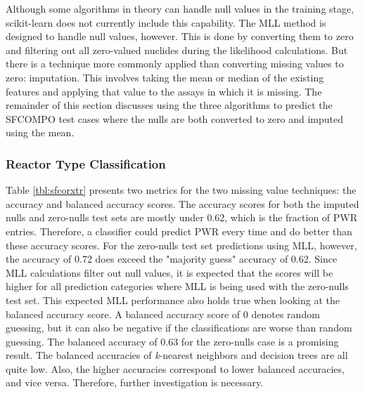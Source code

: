 Although some algorithms in theory can handle null values in the training
stage, scikit-learn does not currently include this capability. The \gls{MLL}
method is designed to handle null values, however. This is done by converting
them to zero and filtering out all zero-valued nuclides during the likelihood
calculations. But there is a technique more commonly applied than converting
missing values to zero: imputation. This involves taking the mean or median of
the existing features and applying that value to the assays in which it is
missing.  The remainder of this section discusses using the three algorithms to
predict the \gls{SFCOMPO} test cases where the nulls are both converted to zero
and imputed using the mean.  

\subsubsection{Reactor Type Classification}

Table \ref{tbl:sfcorxtr} presents two metrics for the two missing value
techniques: the accuracy and balanced accuracy scores. The accuracy scores for
both the imputed nulls and zero-nulls test sets are mostly under 0.62, which is
the fraction of \gls{PWR} entries.  Therefore, a classifier could predict
\gls{PWR} every time and do better than these accuracy scores.  For the
zero-nulls test set predictions using \gls{MLL}, however, the accuracy of 0.72
does exceed the "majority guess" accuracy of 0.62.  Since \gls{MLL}
calculations filter out null values, it is expected that the scores will be
higher for all prediction categories where \gls{MLL} is being used with the
zero-nulls test set. This expected \gls{MLL} performance also holds true when
looking at the balanced accuracy score.  A balanced accuracy score of 0 denotes
random guessing, but it can also be negative if the classifications are worse
than random guessing. The balanced accuracy of 0.63 for the zero-nulls case is
a promising result. The balanced accuracies of \textit{k}-nearest neighbors and
decision trees are all quite low. Also, the higher accuracies correspond to lower
balanced accuracies, and vice versa. Therefore, further investigation is
necessary.

